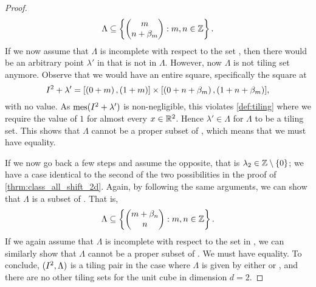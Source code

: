 \documentclass[../thesis.tex]{subfiles}
\begin{document}
\begin{proof}
\begin{equation*}
        \Lambda \subseteq \left\{\begin{pmatrix} m \\ n+\beta_m\end{pmatrix} : m,n \in \mathbb{Z}\right\}.
    \end{equation*}
    If we now assume that $\Lambda$ is incomplete with respect to the set , then there would be an arbitrary point $\lambda'$ in  that is not in $\Lambda$. However, now $\Lambda$ is not tiling set anymore. Observe that we would have an entire square, specifically the square at
    \begin{equation*}
        I^2 + \lambda' = [\left(0+m\right),\left(1+m\right)]\times [\left(0+n+\beta_m\right),\left(1+n+\beta_m\right)], 
    \end{equation*}
    with no value. As $\operatorname{mes}(I^2 + \lambda')$ is non-negligible, this violates \cref{def:tiling} where we require the value of $1$ for almost every $x\in \mathbb{R}^2$. Hence $\lambda'\in \Lambda$ for $\Lambda$ to be a tiling set. This shows that $\Lambda$ cannot be a proper subset of , which means that we must have equality.%
    
    If we now go back a few steps and assume the opposite, that is $\lambda_2 \in \mathbb{Z}\setminus\{0\}$; we have a case identical to the second of the two possibilities in the proof of \cref{thrm:class_all_shift_2d}. Again, by following the same arguments, we can show that $\Lambda$ is a subset of . That is,
    \begin{equation*}  %
        \Lambda \subseteq \braqMed{\begin{pmatrix} m +\beta_n \\ n\end{pmatrix} : m,n \in \Z}.
    \end{equation*}
    If we again assume that $\Lambda$ is incomplete with respect to the set in , we can similarly show that $\Lambda$ cannot be a proper subset of . We must have equality. To conclude, $(I^2, \Lambda)$ is a tiling pair in the case where $\Lambda$ is given by either  or , and there are no other tiling sets for the unit cube in dimension $d=2$.
\end{proof}
\end{document}
